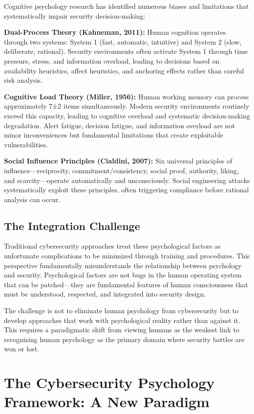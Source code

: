 \documentclass[10pt, twocolumn]{article}
\begin{document}
Cognitive psychology research has identified numerous biases and limitations that systematically impair security decision-making:

\textbf{Dual-Process Theory (Kahneman, 2011):} Human cognition operates through two systems: System 1 (fast, automatic, intuitive) and System 2 (slow, deliberate, rational). Security environments often activate System 1 through time pressure, stress, and information overload, leading to decisions based on availability heuristics, affect heuristics, and anchoring effects rather than careful risk analysis.

\textbf{Cognitive Load Theory (Miller, 1956):} Human working memory can process approximately 7±2 items simultaneously. Modern security environments routinely exceed this capacity, leading to cognitive overload and systematic decision-making degradation. Alert fatigue, decision fatigue, and information overload are not minor inconveniences but fundamental limitations that create exploitable vulnerabilities.

\textbf{Social Influence Principles (Cialdini, 2007):} Six universal principles of influence—reciprocity, commitment/consistency, social proof, authority, liking, and scarcity—operate automatically and unconsciously. Social engineering attacks systematically exploit these principles, often triggering compliance before rational analysis can occur.

\subsection{The Integration Challenge}

Traditional cybersecurity approaches treat these psychological factors as unfortunate complications to be minimized through training and procedures. This perspective fundamentally misunderstands the relationship between psychology and security. Psychological factors are not bugs in the human operating system that can be patched—they are fundamental features of human consciousness that must be understood, respected, and integrated into security design.

The challenge is not to eliminate human psychology from cybersecurity but to develop approaches that work with psychological reality rather than against it. This requires a paradigmatic shift from viewing humans as the weakest link to recognizing human psychology as the primary domain where security battles are won or lost.

\section{The Cybersecurity Psychology Framework: A New Paradigm}
\end{document}
